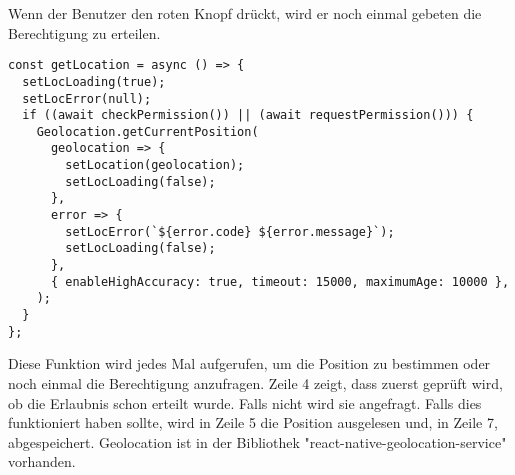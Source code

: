 Wenn der Benutzer den roten Knopf drückt, wird er noch einmal gebeten die Berechtigung zu erteilen.

\newpage
\begin{lstlisting}
const getLocation = async () => {
  setLocLoading(true);
  setLocError(null);
  if ((await checkPermission()) || (await requestPermission())) {
    Geolocation.getCurrentPosition(
      geolocation => {
        setLocation(geolocation);
        setLocLoading(false);
      },
      error => {
        setLocError(`${error.code} ${error.message}`);
        setLocLoading(false);
      },
      { enableHighAccuracy: true, timeout: 15000, maximumAge: 10000 },
    );
  }
};
\end{lstlisting}

Diese Funktion wird jedes Mal aufgerufen, um die Position zu bestimmen oder noch einmal die
Berechtigung anzufragen. Zeile 4 zeigt, dass zuerst geprüft wird, ob die Erlaubnis schon erteilt
wurde. Falls nicht wird sie angefragt. Falls dies funktioniert haben sollte, wird in Zeile 5 die
Position ausgelesen und, in Zeile 7, abgespeichert. Geolocation ist in der Bibliothek
"react-native-geolocation-service" vorhanden.